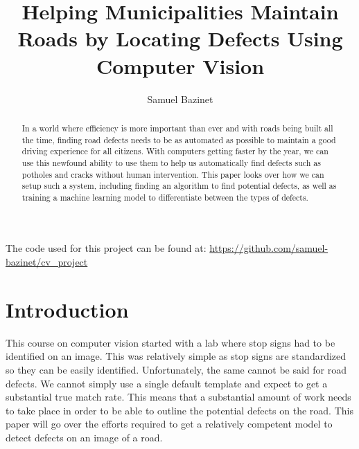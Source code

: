 \documentclass[12pt, letterpaper, twoside]{article}
\title{\textbf{Helping Municipalities Maintain Roads by Locating Defects Using Computer Vision}} %
\author{Samuel Bazinet} %
\affiliation{Ontario Tech University} %
\begin{document}
\maketitle

\begin{abstract}
    \noindent
    
    In a world where efficiency is more important than ever and with roads being built all the time,
    finding road defects needs to be as automated as possible to maintain a good driving experience for all citizens. 
    With computers getting faster by the year, 
    we can use this newfound ability to use them to help us automatically find defects such as potholes and cracks without human intervention.
    This paper looks over how we can setup such a system, 
    including finding an algorithm to find potential defects, 
    as well as training a machine learning model to differentiate between the types of defects.

\end{abstract}

\vspace{2.5cm}

{\footnotesize
    \noindent
    The code used for this project can be found at: \url{https://github.com/samuel-bazinet/cv_project}
}

\thispagestyle{firstpage}

\pagebreak


\newgeometry{} %

\section{Introduction}\label{sec:intro}

This course on computer vision started with a lab where stop signs had to be identified on an image. 
This was relatively simple as stop signs are standardized so they can be easily identified. 
Unfortunately, the same cannot be said for road defects. 
We cannot simply use a single default template and expect to get a substantial true match rate. 
This means that a substantial amount of work needs to take place in order to be able to outline the potential defects on the road.
This paper will go over the efforts required to get a relatively competent model to detect defects on an image of a road. 
\end{document}
